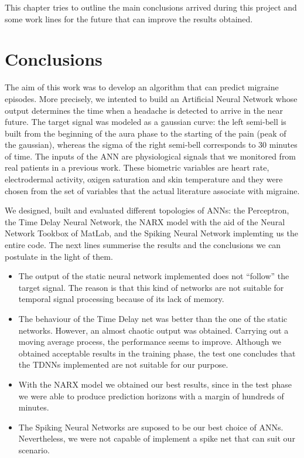 \label{chapter:conclusionsandfuturework}

This chapter tries to outline the main conclusions arrived during this project and some work lines for the future that can improve the results obtained.

\section{Conclusions}
\label{sec:conclusions}
The aim of this work was to develop an algorithm that can predict  migraine episodes. 
More precisely, we intented to build an Artificial Neural Network whose output determines the time when a headache is detected to arrive in the near future. The target signal was modeled as a gaussian curve: the left semi-bell is built from the beginning of the aura phase to the starting of the pain (peak of the gaussian), whereas the sigma of the right semi-bell corresponds to 30 minutes of time.
The inputs of the ANN are physiological signals that we monitored from real patients in a previous work. 
These biometric variables are heart rate, electrodermal activity, oxigen saturation and skin temperature and they were chosen from the set of variables that the actual literature associate with migraine.

We designed, built and evaluated different topologies of ANNs: the Perceptron, the Time Delay Neural Network, the NARX model with the aid of the Neural Network Tookbox of MatLab, and the Spiking Neural Network implemting us the entire code. The next lines summerise the results and the conclusions we can postulate in the light of them.
\begin{itemize}
\item The output of the static neural network implemented does not ``follow'' the target signal. The reason is that this kind of networks are not suitable for temporal signal processing because of its lack of memory. 
\item The behaviour of the Time Delay net was better than the one of the static networks. However, an almost chaotic output was obtained. Carrying out a moving average process, the performance seems to improve. Although we obtained acceptable results in the training phase, the test one concludes that the TDNNs implemented are not suitable for our purpose.
\item With the NARX model we obtained our best results, since in the test phase we were able to produce prediction horizons with a margin of hundreds of minutes.
\item The Spiking Neural Networks are suposed to be our best choice of ANNs. Nevertheless, we were not capable of implement a spike net that can suit our scenario.
\end{itemize}

